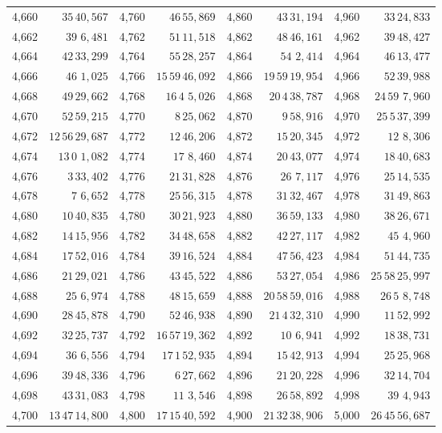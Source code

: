 \begin{tabular}{|r|r||r|r||r|r||r|r|}
4,660 & \(35\,40,\!567\) & 4,760 & \(46\,55,\!869\) & 4,860 & \(43\,31,\!194\) & 4,960 & \(33\,24,\!833\) \\[1pt]
4,662 & \(39\,\,6,\!481\) & 4,762 & \(51\,11,\!518\) & 4,862 & \(48\,46,\!161\) & 4,962 & \(39\,48,\!427\) \\
4,664 & \(42\,33,\!299\) & 4,764 & \(55\,28,\!257\) & 4,864 & \(54\,\,2,\!414\) & 4,964 & \(46\,13,\!477\) \\
4,666 & \(46\,\,1,\!025\) & 4,766 & \(15\,59\,46,\!092\) & 4,866 & \(19\,59\,19,\!954\) & 4,966 & \(52\,39,\!988\) \\
4,668 & \(49\,29,\!662\) & 4,768 & \(16\,4\,\,5,\!026\) & 4,868 & \(20\,4\,38,\!787\) & 4,968 & \(24\,59\,\,7,\!960\) \\[1pt]
4,670 & \(52\,59,\!215\) & 4,770 & \(8\,25,\!062\) & 4,870 & \(9\,58,\!916\) & 4,970 & \(25\,5\,37,\!399\) \\[1pt]
4,672 & \(12\,56\,29,\!687\) & 4,772 & \(12\,46,\!206\) & 4,872 & \(15\,20,\!345\) & 4,972 & \(12\,\,8,\!306\) \\
4,674 & \(13\,0\,\,1,\!082\) & 4,774 & \(17\,\,8,\!460\) & 4,874 & \(20\,43,\!077\) & 4,974 & \(18\,40,\!683\) \\
4,676 & \(3\,33,\!402\) & 4,776 & \(21\,31,\!828\) & 4,876 & \(26\,\,7,\!117\) & 4,976 & \(25\,14,\!535\) \\
4,678 & \(7\,\,6,\!652\) & 4,778 & \(25\,56,\!315\) & 4,878 & \(31\,32,\!467\) & 4,978 & \(31\,49,\!863\) \\[1pt]
4,680 & \(10\,40,\!835\) & 4,780 & \(30\,21,\!923\) & 4,880 & \(36\,59,\!133\) & 4,980 & \(38\,26,\!671\) \\[1pt]
4,682 & \(14\,15,\!956\) & 4,782 & \(34\,48,\!658\) & 4,882 & \(42\,27,\!117\) & 4,982 & \(45\,\,4,\!960\) \\
4,684 & \(17\,52,\!016\) & 4,784 & \(39\,16,\!524\) & 4,884 & \(47\,56,\!423\) & 4,984 & \(51\,44,\!735\) \\
4,686 & \(21\,29,\!021\) & 4,786 & \(43\,45,\!522\) & 4,886 & \(53\,27,\!054\) & 4,986 & \(25\,58\,25,\!997\) \\
4,688 & \(25\,\,6,\!974\) & 4,788 & \(48\,15,\!659\) & 4,888 & \(20\,58\,59,\!016\) & 4,988 & \(26\,5\,\,8,\!748\) \\[1pt]
4,690 & \(28\,45,\!878\) & 4,790 & \(52\,46,\!938\) & 4,890 & \(21\,4\,32,\!310\) & 4,990 & \(11\,52,\!992\) \\[1pt]
4,692 & \(32\,25,\!737\) & 4,792 & \(16\,57\,19,\!362\) & 4,892 & \(10\,\,6,\!941\) & 4,992 & \(18\,38,\!731\) \\
4,694 & \(36\,\,6,\!556\) & 4,794 & \(17\,1\,52,\!935\) & 4,894 & \(15\,42,\!913\) & 4,994 & \(25\,25,\!968\) \\
4,696 & \(39\,48,\!336\) & 4,796 & \(6\,27,\!662\) & 4,896 & \(21\,20,\!228\) & 4,996 & \(32\,14,\!704\) \\
4,698 & \(43\,31,\!083\) & 4,798 & \(11\,\,3,\!546\) & 4,898 & \(26\,58,\!892\) & 4,998 & \(39\,\,4,\!943\) \\[1pt]
4,700 & \(13\,47\,14,\!800\) & 4,800 & \(17\,15\,40,\!592\) & 4,900 & \(21\,32\,38,\!906\) & 5,000 & \(26\,45\,56,\!687\) \\
\hline
\end{tabular}\par
\endgroup
\clearpage

